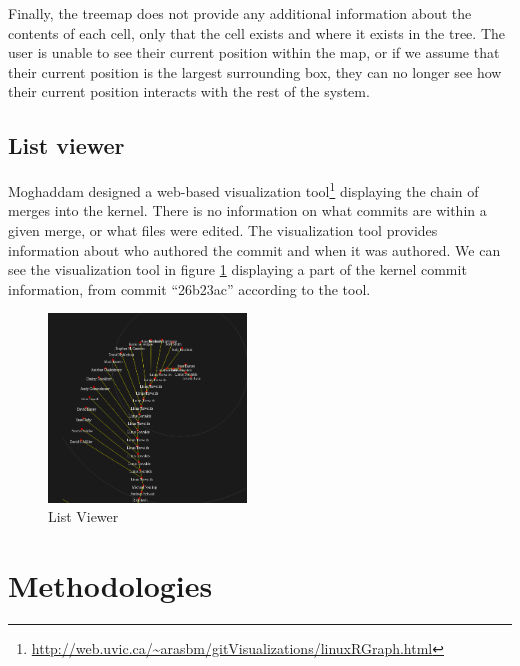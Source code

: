\documentclass[conference, draftclsnofoot, draft]{IEEEtran}
\begin{document}
Finally, the treemap does not provide any additional information about the
contents of each cell, only that the cell exists and where it exists in the
tree. The user is unable to see their current position within the map, or if we
assume that their current position is the largest surrounding box, they can
no longer see how their current position interacts with the rest of the
system.



\subsection{List viewer}

Moghaddam designed a web-based visualization
tool\footnote{\url{http://web.uvic.ca/~arasbm/gitVisualizations/linuxRGraph.html}}
displaying the chain of merges into the kernel. There is no information on what
commits are within a given merge, or what files were edited. The visualization
tool provides information about who authored the commit and when it was
authored. We can see the visualization tool in figure \ref{fig:listviewer}
displaying a part of the kernel commit information, from commit ``26b23ac''
according to the tool.


\begin{figure}
        \centering
        \includegraphics[width=0.47\textwidth]{figures/gitvis.png}
        \caption{List Viewer}
        \label{fig:listviewer}
\end{figure}

\section{Methodologies}
\end{document}
